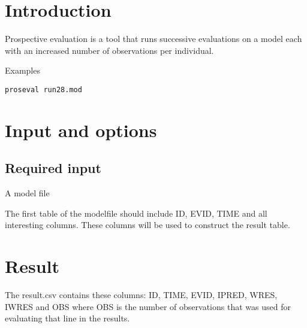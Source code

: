 

\newcommand{\guidetoolname}{proseval}



\maketitle


\section{Introduction}
Prospective evaluation is a tool that runs successive evaluations on a model each with an increased number of observations per individual.

Examples
\begin{verbatim}
proseval run28.mod
\end{verbatim}

\section{Input and options}

\subsection{Required input}
A model file

The first table of the modelfile should include ID, EVID, TIME and all interesting columns. These columns will be used to
construct the result table.


\section{Result}

The result.csv contains these columns: ID, TIME, EVID, IPRED, WRES, IWRES and OBS where
OBS is the number of observations that was used for evaluating that line in the results.

